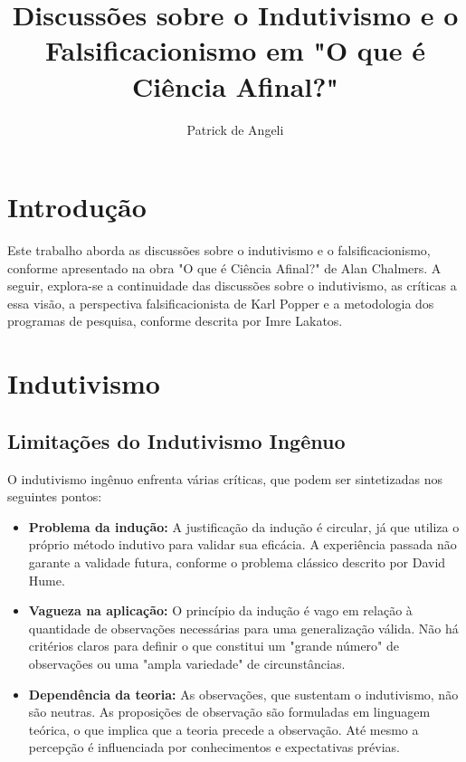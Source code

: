 \documentclass{article} %
\title{Discussões sobre o Indutivismo e o Falsificacionismo em "O que é Ciência Afinal?"}
\author{Patrick de Angeli}
\date{}
\begin{document}
\maketitle
\tableofcontents

\newpage

\section{Introdução}

Este trabalho aborda as discussões sobre o indutivismo e o falsificacionismo, conforme apresentado na obra "O que é Ciência Afinal?" de Alan Chalmers. A seguir, explora-se a continuidade das discussões sobre o indutivismo, as críticas a essa visão, a perspectiva falsificacionista de Karl Popper e a metodologia dos programas de pesquisa, conforme descrita por Imre Lakatos.

\section{Indutivismo}

\subsection{Limitações do Indutivismo Ingênuo}

O indutivismo ingênuo enfrenta várias críticas, que podem ser sintetizadas nos seguintes pontos:

\begin{itemize}
    \item \textbf{Problema da indução:} A justificação da indução é circular, já que utiliza o próprio método indutivo para validar sua eficácia. A experiência passada não garante a validade futura, conforme o problema clássico descrito por David Hume.
    
    \item \textbf{Vagueza na aplicação:} O princípio da indução é vago em relação à quantidade de observações necessárias para uma generalização válida. Não há critérios claros para definir o que constitui um "grande número" de observações ou uma "ampla variedade" de circunstâncias.
    
    \item \textbf{Dependência da teoria:} As observações, que sustentam o indutivismo, não são neutras. As proposições de observação são formuladas em linguagem teórica, o que implica que a teoria precede a observação. Até mesmo a percepção é influenciada por conhecimentos e expectativas prévias.
\end{itemize}
\end{document}
